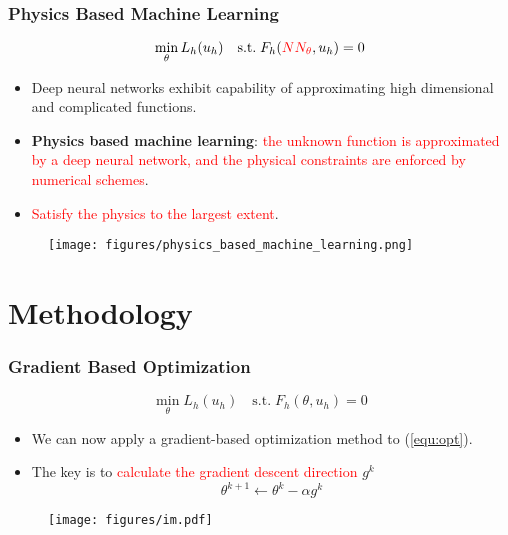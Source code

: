 \documentclass[usenames,dvipsnames]{beamer}
\begin{document}
\begin{frame}
	\frametitle{Physics Based Machine Learning}
	$$\min_{\theta} L_h(u_h) \quad \mathrm{s.t.}\;F_h(\textcolor{red}{NN_\theta}, u_h) = 0$$
	\vspace{-0.5cm}
	\begin{itemize}
		\item Deep neural networks exhibit capability of approximating high dimensional and complicated functions. 
		\item \textbf{Physics based machine learning}: \textcolor{red}{the unknown function is approximated by a deep neural network, and the physical constraints are enforced by numerical schemes}.
		\item \textcolor{red}{Satisfy the physics to the largest extent}.
	\end{itemize}
	\begin{figure}[hbt]
  \texttt{[image: figures/physics\_based\_machine\_learning.png]}
\end{figure}
\end{frame}


\section{Methodology}


\begin{frame}
	\frametitle{Gradient Based Optimization}
	\begin{equation}\label{equ:opt}
	\min_{\theta} L_h(u_h) \quad \mathrm{s.t.}\; F_h(\theta, u_h) = 0
	\end{equation}
	
	\begin{itemize}
		\item We can now apply a gradient-based optimization method to (\ref{equ:opt}).
		\item The key is to \textcolor{red}{calculate the gradient descent direction} $g^k$
		$$\theta^{k+1} \gets \theta^k - \alpha g^k$$ 
	\end{itemize}
	
	\begin{figure}[hbt]
		\centering
		\texttt{[image: figures/im.pdf]}
	\end{figure}
	
\end{frame}
\end{document}
